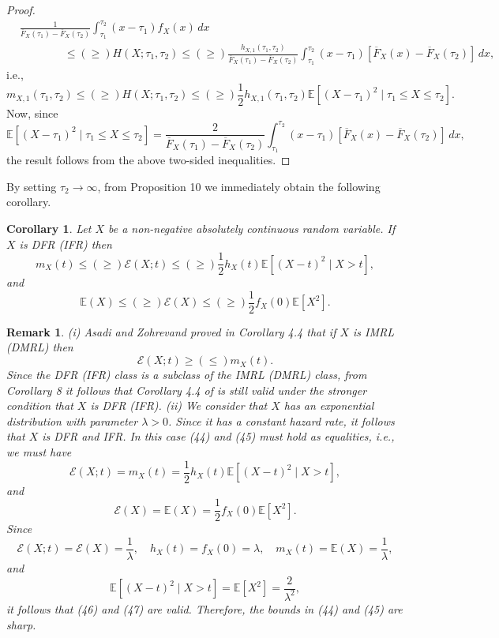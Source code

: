 \documentclass[11pt]{article}
\newtheorem{corollary}{Corollary}
\newtheorem{remark}{Remark}
\begin{document}
\begin{proof}
\begin{align*}
		& \textstyle \frac{1}{\overline{F}_X(\tau_1) - \overline{F}_X(\tau_2)} \int_{\tau_1}^{\tau_2} (x - \tau_1)f_X(x)\, dx \\ 
		& \qquad \qquad \textstyle \leq (\geq) H(X;\tau_1,\tau_2) \leq (\geq) \frac{h_{X,1}(\tau_1,\tau_2)}{\overline{F}_X(\tau_1) - \overline{F}_X(\tau_2)} \int_{\tau_1}^{\tau_2} (x - \tau_1)[\overline{F}_X(x) - \overline{F}_X(\tau_2)]\, dx, 
	\end{align*}
	i.e.,
	$$ \textstyle m_{X,1}(\tau_1,\tau_2) \leq (\geq) H(X;\tau_1,\tau_2) \leq (\geq) \frac{1}{2} h_{X,1}(\tau_1,\tau_2) \mathbb{E}[(X - \tau_1)^2 \mid \tau_1 \leq X \leq \tau_2]. $$
	Now, since
	$$ \textstyle \mathbb{E}[(X - \tau_1)^2 \mid \tau_1 \leq X \leq \tau_2] = \frac{2}{\overline{F}_X(\tau_1) - \overline{F}_X(\tau_2)} \int_{\tau_1}^{\tau_2} (x - \tau_1)[\overline{F}_X(x) - \overline{F}_X(\tau_2)]\, dx, $$
	the result follows from the above two-sided inequalities.
\end{proof}

By setting $\tau_2 \to \infty$, from Proposition 10 we immediately obtain the following corollary.

 
\begin{corollary} 
	Let $X$ be a non-negative absolutely continuous random variable. If $X$ is DFR (IFR) then
	\begin{equation}
		\textstyle m_X(t) \leq (\geq) \mathcal{E}(X;t) \leq (\geq) \frac{1}{2} h_X(t) \mathbb{E}[(X - t)^2 \mid X > t],
	\end{equation}
	and
	\begin{equation}
		\textstyle \mathbb{E}(X) \leq (\geq) \mathcal{E}(X) \leq (\geq) \frac{1}{2} f_X(0) \mathbb{E}[X^2].
	\end{equation}
\end{corollary}

 
\begin{remark}
	(i) Asadi and Zohrevand \cite{Asadi2007} proved in Corollary 4.4 that if $X$ is IMRL (DMRL) then 
	$$ \textstyle \mathcal{E}(X;t) \geq (\leq) m_X(t). $$
	Since the DFR (IFR) class is a subclass of the IMRL (DMRL) class, from Corollary 8 it follows that Corollary 4.4 of \cite{Asadi2007} is still valid under the stronger condition that $X$ is DFR (IFR).  
	(ii) We consider that $X$ has an exponential distribution with parameter $\lambda > 0$. Since it has a constant hazard rate, it follows that $X$ is DFR and IFR. In this case (44) and (45) must hold as equalities, i.e., we must have
	\begin{equation}
		\textstyle \mathcal{E}(X;t) = m_X(t) = \frac{1}{2} h_X(t) \mathbb{E}[(X - t)^2 \mid X > t],
	\end{equation}
	and
	\begin{equation}
		\textstyle \mathcal{E}(X) = \mathbb{E}(X) = \frac{1}{2} f_X(0) \mathbb{E}[X^2].
	\end{equation}
	Since
	$$ \textstyle \mathcal{E}(X;t) = \mathcal{E}(X) = \frac{1}{\lambda}, \quad h_X(t) = f_X(0) = \lambda, \quad m_X(t) = \mathbb{E}(X) = \frac{1}{\lambda}, $$
	and
	$$ \textstyle \mathbb{E}[(X - t)^2 \mid X > t] = \mathbb{E}[X^2] = \frac{2}{\lambda^2}, $$
	it follows that (46) and (47) are valid. Therefore, the bounds in (44) and (45) are sharp.
\end{remark}
\end{document}
